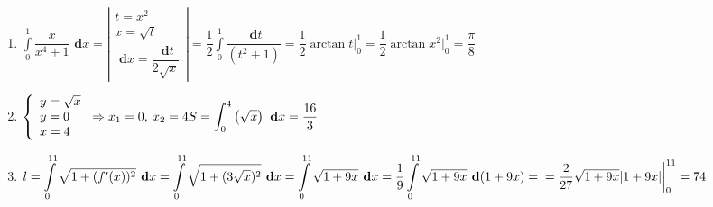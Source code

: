 \documentclass[a4paper,12pt]{article}
\newcommand\dx{\textbf{ d}x}
\newcommand\dt{\textbf{ d}t}
\newcommand\dint{\displaystyle\int}
\newcommand\dy{\textbf{ d}}
\begin{document}
\begin{enumerate}
	\item $\dint\limits_0^1\dfrac{x}{x^4+1}\dx=\left|\begin{array}{l}
		t=x^2\\x=\sqrt t\\\dx=\dfrac{\dt}{2\sqrt{x}}
	\end{array} \right|=\dfrac12\dint\limits_0^1\dfrac{\dt}{(t^2+1)}=\dfrac12\arctan t\bigg|_0^1=\dfrac12\arctan x^2\bigg|_0^1=\dfrac\pi8$
	\item $\left\{\begin{array}{l}
		y=\sqrt x\\
		y=0\\
		x=4
	\end{array} \right.\Rightarrow x_1=0,\>x_2=4\\S=\dint_0^4\left(\sqrt x\right)\dx=\dfrac{16}3$
	\item $l=\dint\limits_0^{11}\sqrt{1+(f'(x))^2}\dx=\dint\limits_0^{11}\sqrt{1+(3\sqrt x)^2}\dx=\dint\limits_0^{11}\sqrt{1+9x}\dx=\dfrac19\dint\limits_0^{11}\sqrt{1+9x}\dy(1+9x)=\\=\dfrac2{27}\sqrt{1+9x}|1+9x|\bigg|_0^{11}=74$
\end{enumerate}	
	
	
	
	
	
	
	
	
\end{document}
